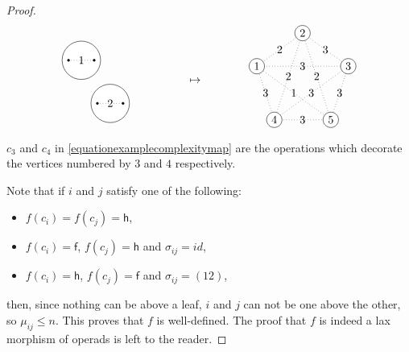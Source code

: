 \documentclass[10pt,a4paper]{amsart}
\newtheorem{scope}{Scope}
\begin{document}
\begin{proof}
\[\begin{tikzpicture}
	\draw[fill=white] (0,0) circle (.6);
	\draw[dotted] (-.4,0) -- (.4,0);
	\draw (0,0) node{\small{$2$}};
	\draw[fill] (-.4,0) circle (1pt);
	\draw[fill] (.4,0) circle (1pt);
	\draw[fill=white] (-.9,1.35) circle (.6);
	\draw[dotted] (-1.3,1.35) -- (-.5,1.35);
	\draw (-.9,1.35) node{\small{$1$}};
	\draw[fill] (-1.3,1.35) circle (1pt);
	\draw[fill] (-.5,1.35) circle (1pt);
	
	\draw (2.65,.7) node{$\mapsto$};
	
	\begin{scope}[shift={(6,.7)},scale=1.5]
	\draw[dotted] ({cos(54)},{-sin(54)}) -- ({cos(18)},{sin(18)}) -- (0,1) -- ({-cos(18)},{sin(18)}) -- ({-cos(54)},{-sin(54)}) -- ({cos(54)},{-sin(54)}) -- (0,1) -- ({-cos(54)},{-sin(54)}) -- ({cos(18)},{sin(18)}) -- ({-cos(18)},{sin(18)}) -- ({cos(54)},{-sin(54)});
	
	\draw[fill=white] ({cos(18)},{sin(18)}) circle (.16) node{\large{$3$}};
	\draw[fill=white] (0,1) circle (.16) node{\large{$2$}};
	\draw[fill=white] ({-cos(18)},{sin(18)}) circle (.16) node{\large{$1$}};
	\draw[fill=white] ({-cos(54)},{-sin(54)}) circle (.16) node{\large{$4$}};
	\draw[fill=white] ({cos(54)},{-sin(54)}) circle (.16) node{\large{$5$}};
	
	\draw (0,{-sin(54)}) node{\small{$3$}};
	\draw ({cos(18)/2+cos(54)/2},{sin(18)/2-sin(54)/2}) node{\small{$3$}};
	\draw ({cos(18)/2},{sin(18)/2+1/2}) node{\small{$3$}};
	\draw ({-cos(18)/2},{sin(18)/2+1/2}) node{\small{$2$}};
	\draw ({-cos(18)/2-cos(54)/2},{sin(18)/2-sin(54)/2}) node{\small{$3$}};
	\draw ({cos(18)/2-cos(54)/2},{sin(18)/2-sin(54)/2}) node{\small{$3$}};
	\draw (0,{sin(18)}) node{\small{$3$}};
	\draw ({cos(54)/2-cos(18)/2},{sin(18)/2-sin(54)/2}) node{\small{$1$}};
	\draw ({cos(54)/2},{1/2-sin(54)/2}) node{\small{$2$}};
	\draw ({-cos(54)/2},{1/2-sin(54)/2}) node {\small{$2$}};
	\end{scope}
	\end{tikzpicture}
	\]
	$c_3$ and $c_4$ in \eqref{equationexamplecomplexitymap} are the operations which decorate the vertices numbered by $3$ and $4$ respectively.
	
	Note that if $i$ and $j$ satisfy one of the following:
	\begin{itemize}
		\item $f(c_i)=f(c_j)=\mathsf{h}$,
		\item $f(c_i)=\mathsf{f}$, $f(c_j)=\mathsf{h}$ and $\sigma_{ij}=id$,
		\item $f(c_i)=\mathsf{h}$, $f(c_j)=\mathsf{f}$ and $\sigma_{ij}=(12)$,
	\end{itemize}
	then, since nothing can be above a leaf, $i$ and $j$ can not be one above the other, so $\mu_{ij} \leq n$. This proves that $f$ is well-defined. The proof that $f$ is indeed a lax morphism of operads is left to the reader.
\end{proof}
\end{document}
